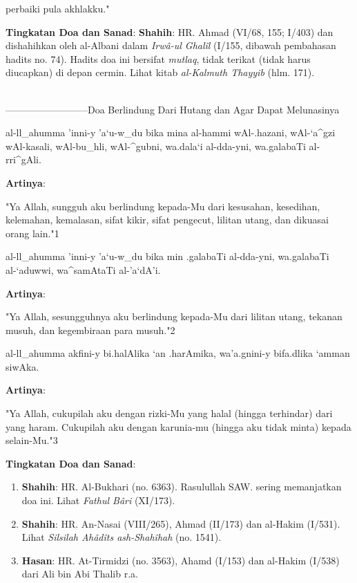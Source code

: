\documentclass[a4paper,12pt]{article}
\begin{document}
perbaiki pula akhlakku."\\
\par
\noindent
\textbf{Tingkatan Doa dan Sanad}: \textbf{Shahih}: HR. Ahmad (VI/68, 155; 
I/403) dan dishahihkan oleh al-Albani dalam \textit{Irw\^{a}-ul Ghal\^{i}l} 
(I/155, dibawah pembahasan hadits no. 74). Hadits doa ini bersifat 
\textit{mutlaq}, tidak terikat (tidak harus diucapkan) di depan cermin. 
Lihat kitab \textit{al-Kalmuth Thayyib} (hlm. 171).\\\\
\par
{}--------------------------Doa Berlindung Dari Hutang dan Agar Dapat Melunasinya
\begin{arabtext}
\noindent
al-ll_ahumma 'inni-y 'a`u-w_du bika mina al-hammi wAl-.hazani, wAl-`a^gzi 
wAl-kasali, wAl-bu_hli, wAl-^gubni, wa.dala`i al-dda-yni, wa.galabaTi 
al-rri^gAli.\\
\end{arabtext}
\noindent
\textbf{Artinya}:
\par
\indent
"Ya Allah, sungguh aku  berlindung kepada-Mu dari kesusahan, kesedihan, 
kelemahan, kemalasan, sifat kikir, sifat pengecut, lilitan utang, dan 
dikuasai orang lain."{\scriptsize 1}\\
\begin{arabtext}
\noindent
al-ll_ahumma 'inni-y 'a`u-w_du bika min .galabaTi al-dda-yni, wa.galabaTi 
al-`aduwwi, wa^samAtaTi al-'a`dA'i.\\
\end{arabtext}
\noindent
\textbf{Artinya}:
\par
\indent
"Ya Allah, sesungguhnya aku berlindung kepada-Mu dari lilitan utang, 
tekanan musuh, dan kegembiraan para musuh."{\scriptsize 2}\\
\begin{arabtext}
\noindent
al-ll_ahumma akfini-y bi.halAlika `an .harAmika, wa'a.gnini-y bifa.dlika 
`amman siwAka.\\
\end{arabtext}
\noindent
\textbf{Artinya}:
\par
\indent
"Ya Allah, cukupilah aku dengan rizki-Mu yang halal (hingga terhindar) dari
yang haram. Cukupilah aku dengan karunia-mu (hingga aku tidak minta) kepada
selain-Mu."{\scriptsize 3}\\
\par
\noindent
\textbf{Tingkatan Doa dan Sanad}:
\begin{enumerate}
\item \textbf{Shahih}: HR. Al-Bukhari (no. 6363). Rasulullah SAW. sering 
memanjatkan doa ini. Lihat \textit{Fathul B\^{a}ri} (XI/173).
\item \textbf{Shahih}: HR. An-Nasai (VIII/265), Ahmad (II/173) dan al-Hakim
(I/531). Lihat \textit{Silsilah Ah\^{a}d\^{i}ts ash-Shah\^{i}hah} (no. 
1541).
\item \textbf{Hasan}: HR. At-Tirmidzi (no. 3563), Ahamd (I/153) dan 
al-Hakim (I/538) dari Ali bin Abi Thalib r.a.\\\\
\end{enumerate}
\end{document}
